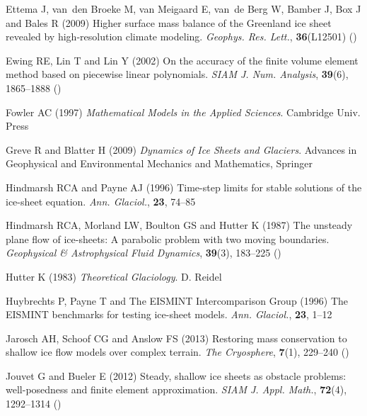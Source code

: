 \documentclass[twocolumn,letterpaper]{igs}
\begin{document}
\begin{thebibliography}{42}
Ettema J, van~den Broeke M, van Meigaard E, van~de Berg W, Bamber J, Box J and
  Bales R (2009) Higher surface mass balance of the {G}reenland ice sheet
  revealed by high-resolution climate modeling. \emph{Geophys. Res. Lett.},
  \textbf{36}(L12501) ()

Ewing RE, Lin T and Lin Y (2002) On the accuracy of the finite volume element
  method based on piecewise linear polynomials. \emph{SIAM J. Num. Analysis},
  \textbf{39}(6), 1865--1888 ()

Fowler AC (1997) \emph{Mathematical Models in the Applied Sciences}. Cambridge
  Univ. Press

Greve R and Blatter H (2009) \emph{Dynamics of {I}ce {S}heets and {G}laciers}.
  Advances in Geophysical and Environmental Mechanics and Mathematics, Springer

Hindmarsh RCA and Payne AJ (1996) Time-step limits for stable solutions of the
  ice-sheet equation. \emph{Ann. Glaciol.}, \textbf{23}, 74--85

Hindmarsh RCA, Morland LW, Boulton GS and Hutter K (1987) The unsteady plane
  flow of ice-sheets: A parabolic problem with two moving boundaries.
  \emph{Geophysical \& Astrophysical Fluid Dynamics}, \textbf{39}(3), 183--225
  ()

Hutter K (1983) \emph{Theoretical {G}laciology}. D. Reidel

Huybrechts P, Payne T and {The EISMINT Intercomparison Group} (1996) The
  {EISMINT} benchmarks for testing ice-sheet models. \emph{Ann. Glaciol.},
  \textbf{23}, 1--12

Jarosch AH, Schoof CG and Anslow FS (2013) Restoring mass conservation to
  shallow ice flow models over complex terrain. \emph{The Cryosphere},
  \textbf{7}(1), 229--240 ()

Jouvet G and Bueler E (2012) Steady, shallow ice sheets as obstacle problems:
  well-posedness and finite element approximation. \emph{SIAM J. Appl. Math.},
  \textbf{72}(4), 1292--1314 ()


\end{thebibliography}
\end{document}
